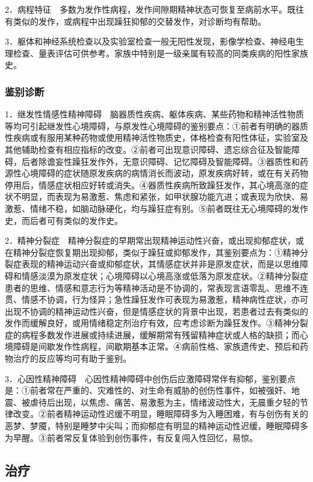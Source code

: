 2．病程特征　多数为发作性病程，发作间隙期精神状态可恢复至病前水平。既往有类似的发作，或病程中出现躁狂抑郁的交替发作，对诊断均有帮助。

3．躯体和神经系统检查以及实验室检查一般无阳性发现，影像学检查、神经电生理检查、量表评估可供参考。家族中特别是一级亲属有较高的同类疾病的阳性家族史。

\subsubsection{鉴别诊断}

1．继发性情感性精神障碍　脑器质性疾病、躯体疾病、某些药物和精神活性物质等均可引起继发性心境障碍，与原发性心境障碍的鉴别要点：①前者有明确的器质性疾病或有服用某种药物或使用精神活性物质史，体格检查有阳性体征，实验室及其他辅助检查有相应指标的改变。②前者可出现意识障碍、遗忘综合征及智能障碍，后者除谵妄性躁狂发作外，无意识障碍、记忆障碍及智能障碍。③器质性和药源性心境障碍的症状随原发疾病的病情消长而波动，原发疾病好转，或在有关药物停用后，情感症状相应好转或消失。④器质性疾病所致躁狂发作，其心境高涨的症状不明显，而表现为易激惹、焦虑和紧张，如甲状腺功能亢进；或表现为欣快、易激惹、情绪不稳，如脑动脉硬化，均与躁狂症有别。⑤前者既往无心境障碍的发作史，而后者可有类似的发作史。

2．精神分裂症　精神分裂症的早期常出现精神运动性兴奋，或出现抑郁症状，或在精神分裂症恢复期出现抑郁，类似于躁狂或抑郁发作，其鉴别要点为：①精神分裂症表现的精神运动兴奋或抑郁症状，其情感症状并非是原发症状，而是以思维障碍和情感淡漠为原发症状；心境障碍以心境高涨或低落为原发症状。②精神分裂症患者的思维、情感和意志行为等精神活动是不协调的，常表现言语零乱、思维不连贯、情感不协调，行为怪异；急性躁狂发作可表现为易激惹，精神病性症状，亦可出现不协调的精神运动性兴奋，但是情感症状的背景中出现，若患者过去有类似的发作而缓解良好，或用情绪稳定剂治疗有效，应考虑诊断为躁狂发作。③精神分裂症的病程多数发作进展或持续进展，缓解期常有残留精神症状或人格的缺损；而心境障碍是间歇发作性病程，间歇期基本正常。④病前性格、家族遗传史、预后和药物治疗的反应等均可有助于鉴别。

3．心因性精神障碍　心因性精神障碍中创伤后应激障碍常伴有抑郁，鉴别要点是：①前者常在严重的、灾难性的、对生命有威胁的创伤性事件，如被强奸、地震、被虐待后出现，以焦虑、痛苦、易激惹为主，情绪波动性大，无晨重夕轻的节律改变。②前者精神运动性迟缓不明显，睡眠障碍多为入睡困难，有与创伤有关的恶梦、梦魇，特别是睡梦中尖叫；而抑郁症有明显的精神运动性迟缓，睡眠障碍多为早醒。③前者常反复体验到创伤事件，有反复闯入性回忆，易惊。

\subsection{治疗}

